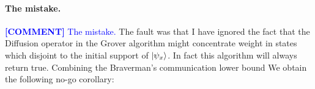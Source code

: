 \documentclass{article}
\newcommand{\commentt}[1]{\textcolor{blue}{ \textbf{[COMMENT]} #1}}
\newcommand{\ctt}[1]{\commentt{#1}}
\begin{document}
\begin{multicols*}{2}
\paragraph{ The mistake.} \ctt{The mistake.} The fault was that I have ignored the fact that the Diffusion operator in the Grover algorithm might concentrate weight in states which disjoint to the initial support of \( \ket{\psi_{x}}\). In fact this algorithm will always return true. 
Combining the Braverman's communication  lower bound We obtain the following no-go corollary:  
\printbibliography 
\end{multicols*}
\end{document}
